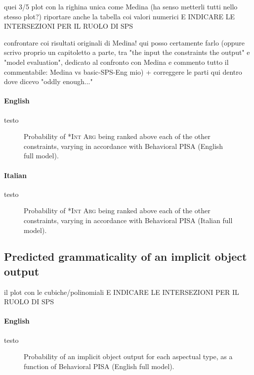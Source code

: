 quei 3/5 plot con la righina unica come Medina (ha senso metterli tutti nello stesso plot?)
riportare anche la tabella coi valori numerici E INDICARE LE INTERSEZIONI PER IL RUOLO DI SPS

confrontare coi risultati originali di Medina! qui posso certamente farlo (oppure scrivo proprio un capitoletto a parte, tra "the input the constraints the output" e "model evaluation", dedicato al confronto con Medina e commento tutto il commentabile: Medina vs basic-SPS-Eng mio) + correggere le parti qui dentro dove dicevo "oddly enough..."

\paragraph{English} testo

\begin{figure}[htb]
\caption{Probability of \textsc{*Int Arg} being ranked above each of the other constraints, varying in accordance with Behavioral PISA (English full model).}
    
\end{figure}

\paragraph{Italian} testo

\begin{figure}[htb]
\caption{Probability of \textsc{*Int Arg} being ranked above each of the other constraints, varying in accordance with Behavioral PISA (Italian full model).}
    
\end{figure}


\subsection{Predicted grammaticality of an implicit object output} 

il plot con le cubiche/polinomiali E INDICARE LE INTERSEZIONI PER IL RUOLO DI SPS

\paragraph{English} testo

\begin{figure}[htb]
\caption{Probability of an implicit object output for each aspectual type, as a function of Behavioral PISA (English full model).}
    
\end{figure}

